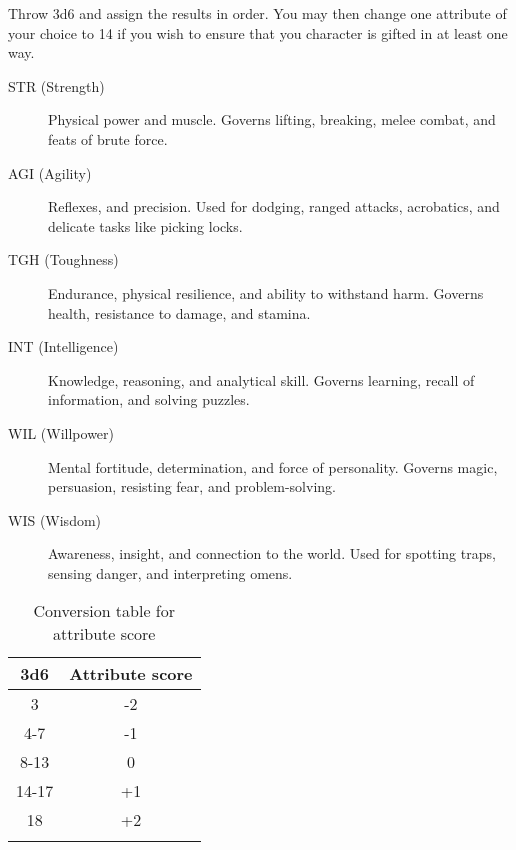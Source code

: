 \documentclass[itdr/core]{subfiles}
\begin{document}
Throw 3d6 and assign the results in order. You may then change one attribute of your choice to 14 if you wish to ensure that you character is gifted in at least one way.

\begin{description}
\item[STR (Strength)] Physical power and muscle. Governs lifting, breaking, melee combat, and feats of brute force.
\item[AGI (Agility)] Reflexes, and precision. Used for dodging, ranged attacks, acrobatics, and delicate tasks like picking locks.
\item[TGH (Toughness)] Endurance, physical resilience, and ability to withstand harm. Governs health, resistance to damage, and stamina.
\item[INT (Intelligence)] Knowledge, reasoning, and analytical skill. Governs learning, recall of information, and solving puzzles.
\item[WIL (Willpower)] Mental fortitude, determination, and force of personality. Governs magic, persuasion, resisting fear, and problem-solving.
\item[WIS (Wisdom)] Awareness, insight, and connection to the world. Used for spotting traps, sensing danger, and interpreting omens.
\end{description}

\begin{longtable}{cc}
\hline
\textbf{3d6} & \textbf{Attribute score} \\
\hline
3 & -2 \\
4-7 & -1 \\
8-13 & 0 \\
14-17 & +1 \\
18 & +2 \\
\hline
\caption{Conversion table for attribute score}
\label{table:attribute-conversion}
\end{longtable}
\end{document}
